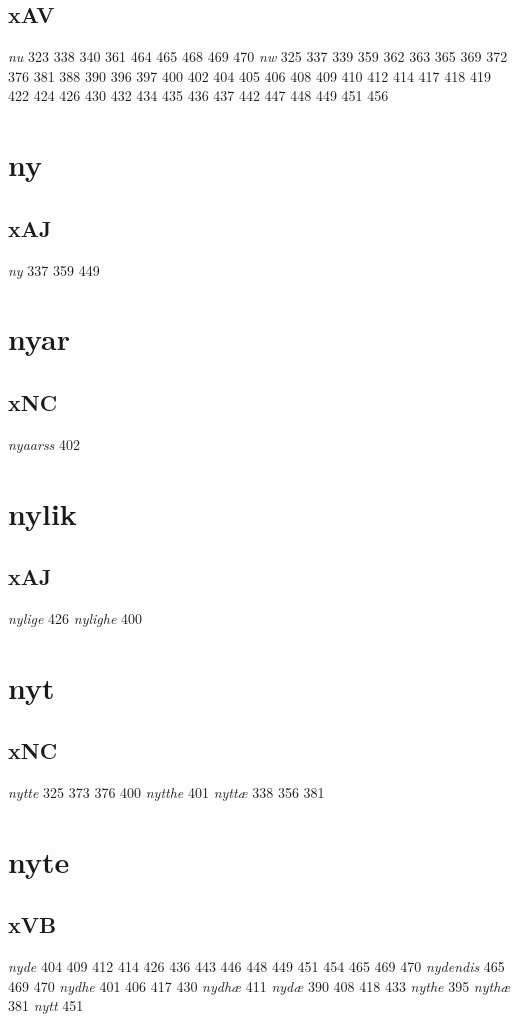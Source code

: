 \documentclass[a4paper,twocolumn]{article}
\begin{document}
\subsection{xAV}
\label{sec:org64c8866}
\emph{nu} 323 338 340 361 464 465 468 469 470 \emph{nw} 325 337 339 359 362 363 365 369 372 376 381 388 390 396 397 400 402 404 405 406 408 409 410 412 414 417 418 419 422 424 426 430 432 434 435 436 437 442 447 448 449 451 456 
\section{ny}
\label{sec:org5074fcb}
\subsection{xAJ}
\label{sec:org790e30c}
\emph{ny} 337 359 449 
\section{nyar}
\label{sec:org0a4f760}
\subsection{xNC}
\label{sec:org8489cea}
\emph{nyaarss} 402 
\section{nylik}
\label{sec:orgaf02404}
\subsection{xAJ}
\label{sec:org87f3f99}
\emph{nylige} 426 \emph{nylighe} 400 
\section{nyt}
\label{sec:orgeb3e264}
\subsection{xNC}
\label{sec:orgbad0a75}
\emph{nytte} 325 373 376 400 \emph{nytthe} 401 \emph{nyttæ} 338 356 381 
\section{nyte}
\label{sec:org061e763}
\subsection{xVB}
\label{sec:org6ead249}
\emph{nyde} 404 409 412 414 426 436 443 446 448 449 451 454 465 469 470 \emph{nydendis} 465 469 470 \emph{nydhe} 401 406 417 430 \emph{nydhæ} 411 \emph{nydæ} 390 408 418 433 \emph{nythe} 395 \emph{nythæ} 381 \emph{nytt} 451 
\end{document}
